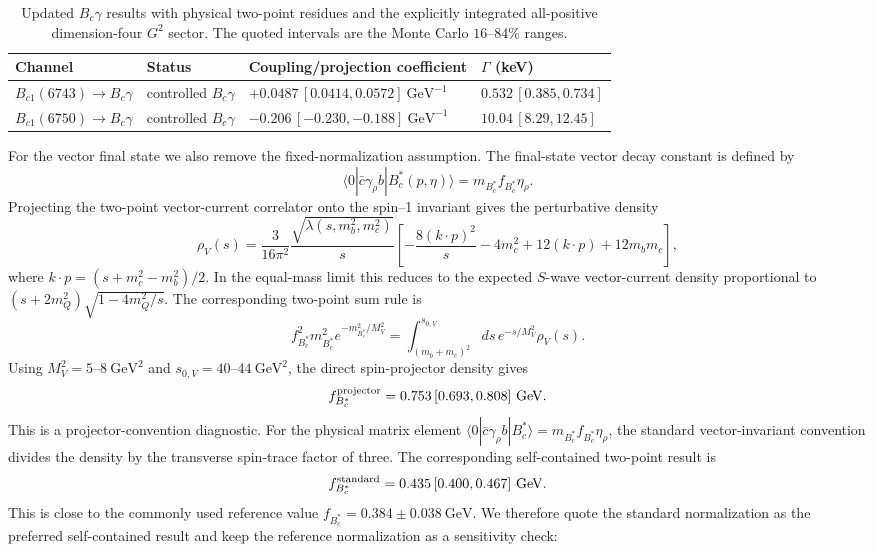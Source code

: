 \documentclass[11pt]{article}
\newcommand{\Bc}{B_c}
\newcommand{\Bcst}{B_c^\ast}
\newcommand{\BcOne}{B_{c1}}
\newcommand{\GeV}{\mathrm{GeV}}
\begin{document}
\begin{table}[h]
\centering
\caption{Updated \(B_c\gamma\) results with physical two-point residues and
the explicitly integrated all-positive dimension-four \(G^2\) sector.  The
quoted intervals are the Monte Carlo \(16\)--\(84\%\) ranges.}
\scriptsize
\setlength{\tabcolsep}{3pt}
\begin{tabular}{p{}p{}p{}p{}}
\toprule
Channel & Status & Coupling/projection coefficient & \(\Gamma\) (keV)\\
\midrule
\(\BcOne(6743)\to\Bc\gamma\)
& controlled \(B_c\gamma\)
& \(+0.0487\,[0.0414,0.0572]~\GeV^{-1}\)
& \(0.532\,[0.385,0.734]\)\\
\(\BcOne(6750)\to\Bc\gamma\)
& controlled \(B_c\gamma\)
& \(-0.206\,[-0.230,-0.188]~\GeV^{-1}\)
& \(10.04\,[8.29,12.45]\)\\
\bottomrule
\end{tabular}
\end{table}

For the vector final state we also remove the fixed-normalization assumption.
The final-state vector decay constant is defined by
\[
  \langle0|\bar c\gamma_\rho b|\Bcst(p,\eta)\rangle
  =m_{\Bcst}f_{\Bcst}\eta_\rho .
\]
Projecting the two-point vector-current correlator onto the spin--1 invariant
gives the perturbative density
\[
  \rho_V(s)=
  \frac{3}{16\pi^2}\frac{\sqrt{\lambda(s,m_b^2,m_c^2)}}{s}
  \left[
    -\frac{8(k\cdot p)^2}{s}-4m_c^2+12(k\cdot p)+12m_bm_c
  \right],
\]
where \(k\cdot p=(s+m_c^2-m_b^2)/2\).  In the equal-mass limit this reduces to
the expected \(S\)-wave vector-current density proportional to
\((s+2m_Q^2)\sqrt{1-4m_Q^2/s}\).  The corresponding two-point sum rule is
\[
  f_{\Bcst}^2m_{\Bcst}^2e^{-m_{\Bcst}^2/M_V^2}
  =
  \int_{(m_b+m_c)^2}^{s_{0,V}}ds\,e^{-s/M_V^2}\rho_V(s).
\]
Using \(M_V^2=5\)--\(8~\GeV^2\) and \(s_{0,V}=40\)--\(44~\GeV^2\), the direct
spin-projector density gives
\[
  f_{\Bcst}^{\rm projector}=0.753\,[0.693,0.808]~\GeV .
\]
This is a projector-convention diagnostic.  For the physical matrix element
\(\langle0|\bar c\gamma_\rho b|\Bcst\rangle=m_{\Bcst}f_{\Bcst}\eta_\rho\), the
standard vector-invariant convention divides the density by the transverse
spin-trace factor of three.  The corresponding self-contained two-point result
is
\[
  f_{\Bcst}^{\rm standard}=0.435\,[0.400,0.467]~\GeV .
\]
This is close to the commonly used reference value
\(f_{\Bcst}=0.384\pm0.038~\GeV\).  We therefore quote the standard
normalization as the preferred self-contained result and keep the reference
normalization as a sensitivity check:
\end{document}
